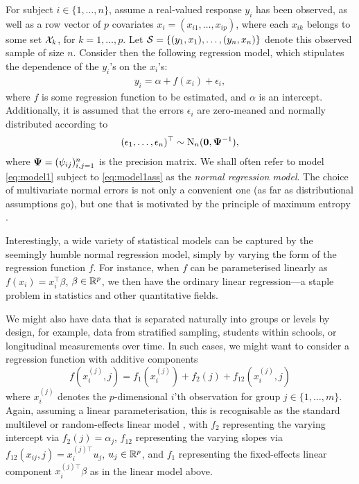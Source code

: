 \documentclass[11pt,twoside,openright,showframe]{report}
\begin{document}
For subject $i \in \{1,\dots,n\}$, assume a real-valued response $y_i$ has been observed, as well as a row vector of $p$ covariates $x_i = (x_{i1},\dots,x_{ip})$, where each $x_{ik}$ belongs to some set ${\mathcal X}_k$, for $k = 1,\dots,p$.
Let ${\mathcal S} = \{(y_1, x_1), \dots, (y_n,x_n)\}$ denote this observed sample of size $n$.
Consider then the following regression model, which stipulates the dependence of the $y_i$'s on the $x_i$'s:
\begin{align}\label{eq:model1}
  y_i = \alpha + f(x_i) + \epsilon_i,
\end{align}
where $f$ is some regression function to be estimated, and $\alpha$ is an intercept.
Additionally, it is assumed that the errors $\epsilon_i$ are zero-meaned and normally distributed according to
\begin{align}\label{eq:model1ass}
  (\epsilon_1, \dots, \epsilon_n)^\top \sim \operatorname{N}_n({\mathbf 0}, {\bm\Psi}^{-1}),
\end{align}
where ${\bm\Psi} = (\psi_{ij})_{i,j=1}^n$ is the precision matrix.
We shall often refer to model \cref{eq:model1} subject to \cref{eq:model1ass} as the \emph{normal regression model}.
The choice of multivariate normal errors is not only a convenient one (as far as distributional assumptions go), but one that is motivated by the principle of maximum entropy \citep{jaynes1957a,jaynes1957b,jaynes2003probability}.

Interestingly, a wide variety of statistical models can be captured by the seemingly humble normal regression model, simply by varying the form of the regression function $f$.
For instance, when $f$ can be parameterised linearly as $f(x_i) = x_i^\top \beta$, $\beta \in \mathbb{R}^p$, we then have the ordinary linear regression---a staple problem in statistics and other quantitative fields.

We might also have data that is separated naturally into groups or levels by design, for example, data from stratified sampling, students within schools, or longitudinal measurements over time.
In such cases, we might want to consider a regression function with additive components
\[
  f(x_i^{(j)}, j) = f_1(x_i^{(j)}) + f_2(j) + f_{12}(x_i^{(j)}, j)
\]
where $x_i^{(j)}$ denotes the $p$-dimensional $i$'th observation for group $j\in\{1,\dots,m\}$.
Again, assuming a linear parameterisation, this is recognisable as the standard multilevel or random-effects linear model \citep{skrondal2012multilevel}, with $f_2$ representing the varying intercept via $f_2(j) = \alpha_{j}$, $f_{12}$ representing the varying slopes via $f_{12}(x_{ij},j) = x_i^{(j)\top} u_{j}$,  $u_j \in \mathbb{R}^p$, and $f_1$ representing the fixed-effects linear component $ x_i^{(j)\top} \beta$ as in the linear model above.
\end{document}
